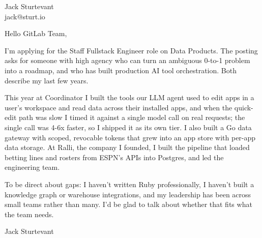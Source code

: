 \documentclass[11pt]{article}
\begin{document}
\raggedright

{\namefont\fontsize{20pt}{24pt}\selectfont Jack Sturtevant}\\[-0.3em]
jack@sturt.io

\vspace{1.2em}

Hello GitLab Team,

I'm applying for the Staff Fullstack Engineer role on Data Products. The posting asks for someone with high agency who can turn an ambiguous 0-to-1 problem into a roadmap, and who has built production AI tool orchestration. Both describe my last few years.

This year at Coordinator I built the tools our LLM agent used to edit apps in a user's workspace and read data across their installed apps, and when the quick-edit path was slow I timed it against a single model call on real requests; the single call was 4-6x faster, so I shipped it as its own tier. I also built a Go data gateway with scoped, revocable tokens that grew into an app store with per-app data storage. At Ralli, the company I founded, I built the pipeline that loaded betting lines and rosters from ESPN's APIs into Postgres, and led the engineering team.

To be direct about gaps: I haven't written Ruby professionally, I haven't built a knowledge graph or warehouse integrations, and my leadership has been across small teams rather than many. I'd be glad to talk about whether that fits what the team needs.

\vspace{0.6em}
Jack Sturtevant
\end{document}
